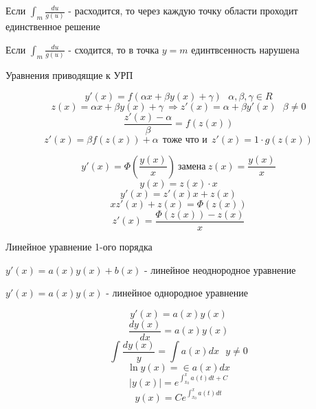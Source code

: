 \begin{theorem}
  Если $\int_m \frac{du}{g(u)}$ - расходится, то через каждую точку области
  проходит единственное решение

  Если $\int_m \frac{du}{g(u)}$ - сходится, то в точка $y = m$ единтвсенность
  нарушена
\end{theorem}

\begin{title}[\Large]
  Уравнения приводящие к УРП
\end{title}

\begin{block}
  $$
  y'(x) = f(\alpha x + \beta y(x) + \gamma) ~~~ \alpha, \beta, \gamma \in R
  $$
  $$
  z(x) = \alpha x + \beta y(x) + \gamma ~ \Rightarrow z'(x) = \alpha +
  \beta y'(x) ~~~ \beta \not= 0
  $$
  $$
  \frac{z'(x) - \alpha}{\beta} = f(z(x))
  $$
  $$
  z'(x) = \beta f(z(x)) + \alpha ~~ \text{тоже что и} ~~
  z'(x) = 1 \cdot g(z(x))
  $$
\end{block}

\begin{block}
  $$
  y'(x) = \Phi \left( \frac{y(x)}{x} \right) ~ \text{замена} ~ z(x) =
  \frac{y(x)}{x}
  $$
  $$
  y(x) = z(x) \cdot x
  $$
  $$
  y'(x) = z'(x) x + z(x)
  $$
  $$
  x z'(x) + z(x) = \Phi(z(x))
  $$
  $$
  z'(x) = \frac{\Phi(z(x)) - z(x)}{x}
  $$
\end{block}

\begin{title}[\Large]
  Линейное уравнение 1-ого порядка
\end{title}

\begin{define}
  $y'(x) = a(x)y(x) + b(x)$ - линейное неоднородное уравнение

  $y'(x) = a(x)y(x)$ - линейное однородное уравнение
\end{define}

\begin{block}
  $$
  y'(x) = a(x)y(x)
  $$
  $$
  \frac{dy(x)}{dx} = a(x)y(x)
  $$
  $$
  \int \frac{dy(x)}{y} = \int a(x)dx ~~~ y \not= 0
  $$
  $$
  \ln y(x) = \in a(x)dx
  $$
  $$
  |y(x)| = e^{\int_{x_0}^x a(t) dt + C}
  $$
  $$
  y(x) = C e^{\int_{x_0}^x a(t) dt}
  $$
\end{block}


